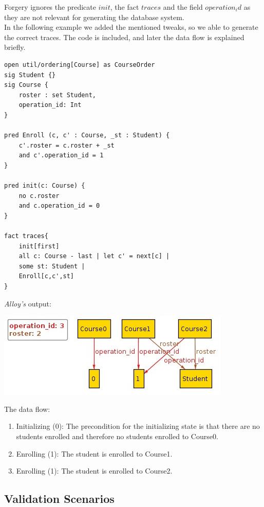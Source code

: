 \documentclass[oneside]{book}
\begin{document}
Forgery ignores the predicate $init$, the fact $traces$ and the field $operation_id$ as they are not relevant for generating the database system.\\

In the following example we added the mentioned tweaks, so we able to generate the correct traces. The code is included, and later the data flow is explained briefly.\\

\begin{lstlisting}
open util/ordering[Course] as CourseOrder
sig Student {}
sig Course {
	roster : set Student,
	operation_id: Int
}

pred Enroll (c, c' : Course, _st : Student) {
	c'.roster = c.roster + _st
	and c'.operation_id = 1 
}

pred init(c: Course) {
	no c.roster
	and c.operation_id = 0
}

fact traces{
    init[first]
    all c: Course - last | let c' = next[c] | 
	some st: Student |
	Enroll[c,c',st]
}
\end{lstlisting}

\textit{Alloy's} output:\\
\begin{center}
\includegraphics[scale=0.7]{output_traces}
\end{center}

The data flow:
\begin{enumerate}
	\item Initializing (0): The precondition for the initializing state is that there are no students enrolled and therefore no students enrolled to Course0.
	\item Enrolling (1): The student is enrolled to Course1.
	\item Enrolling (1): The student is enrolled to Course2.
\end{enumerate}

\subsection{Validation Scenarios}
\end{document}
